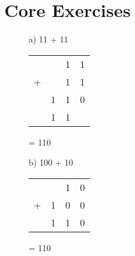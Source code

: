 \section*{Core Exercises}
\begin{figure}[H]
    \begin{minipage}[t]{0.45\textwidth}
        a) 11 + 11
        \begin{table}[H]
            \centering
            \begin{tabularx}{0.5\linewidth}{rXXX}
                & & 1 & 1\\
                + & & 1 & 1\\
                \cline{2-4}
                & 1 & 1 & 0 \\
                \cline{2-4}
                & 1 & 1 &
            \end{tabularx}
        \end{table}
        = 110
    \end{minipage}\hfill
    \begin{minipage}[t]{0.45\textwidth}
        b) 100 + 10
        \begin{table}[H]
            \centering
            \begin{tabularx}{0.5\linewidth}{rXXX}
                & & 1 & 0\\
                + & 1 & 0 & 0\\
                \cline{2-4}
                & 1 & 1 & 0 \\
                \cline{2-4}
            \end{tabularx}
        \end{table}
        = 110
    \end{minipage}\hfill
\end{figure}

